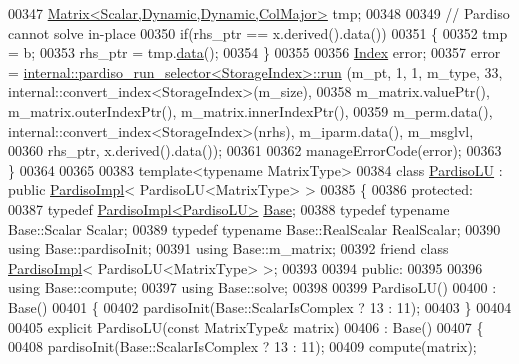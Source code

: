 \begin{DoxyCode}
00347   \hyperlink{group___core___module_class_eigen_1_1_matrix}{Matrix<Scalar,Dynamic,Dynamic,ColMajor>} tmp;
00348   
00349   \textcolor{comment}{// Pardiso cannot solve in-place}
00350   \textcolor{keywordflow}{if}(rhs\_ptr == x.derived().data())
00351   \{
00352     tmp = b;
00353     rhs\_ptr = tmp.\hyperlink{class_eigen_1_1_plain_object_base_ac25699535374b1854cf8494e44ad31b2}{data}();
00354   \}
00355   
00356   \hyperlink{namespace_eigen_a62e77e0933482dafde8fe197d9a2cfde}{Index} error;
00357   error = \hyperlink{struct_eigen_1_1internal_1_1pardiso__run__selector}{internal::pardiso\_run\_selector<StorageIndex>::run}
      (m\_pt, 1, 1, m\_type, 33, internal::convert\_index<StorageIndex>(m\_size),
00358                                                             m\_matrix.valuePtr(), m\_matrix.outerIndexPtr(), 
      m\_matrix.innerIndexPtr(),
00359                                                             m\_perm.data(), 
      internal::convert\_index<StorageIndex>(nrhs), m\_iparm.data(), m\_msglvl,
00360                                                             rhs\_ptr, x.derived().data());
00361 
00362   manageErrorCode(error);
00363 \}
00364 
00365 
00383 \textcolor{keyword}{template}<\textcolor{keyword}{typename} MatrixType>
00384 \textcolor{keyword}{class }\hyperlink{class_eigen_1_1_pardiso_l_u}{PardisoLU} : \textcolor{keyword}{public} \hyperlink{class_eigen_1_1_pardiso_impl}{PardisoImpl}< PardisoLU<MatrixType> >
00385 \{
00386   \textcolor{keyword}{protected}:
00387     \textcolor{keyword}{typedef} \hyperlink{class_eigen_1_1_pardiso_impl}{PardisoImpl<PardisoLU>} \hyperlink{group___sparse_core___module}{Base};
00388     \textcolor{keyword}{typedef} \textcolor{keyword}{typename} Base::Scalar Scalar;
00389     \textcolor{keyword}{typedef} \textcolor{keyword}{typename} Base::RealScalar RealScalar;
00390     \textcolor{keyword}{using} Base::pardisoInit;
00391     \textcolor{keyword}{using} Base::m\_matrix;
00392     \textcolor{keyword}{friend} \textcolor{keyword}{class }\hyperlink{class_eigen_1_1_pardiso_impl}{PardisoImpl}< PardisoLU<MatrixType> >;
00393 
00394   \textcolor{keyword}{public}:
00395 
00396     \textcolor{keyword}{using} Base::compute;
00397     \textcolor{keyword}{using} Base::solve;
00398 
00399     PardisoLU()
00400       : Base()
00401     \{
00402       pardisoInit(Base::ScalarIsComplex ? 13 : 11);
00403     \}
00404 
00405     \textcolor{keyword}{explicit} PardisoLU(\textcolor{keyword}{const} MatrixType& matrix)
00406       : Base()
00407     \{
00408       pardisoInit(Base::ScalarIsComplex ? 13 : 11);
00409       compute(matrix);

\end{DoxyCode}
